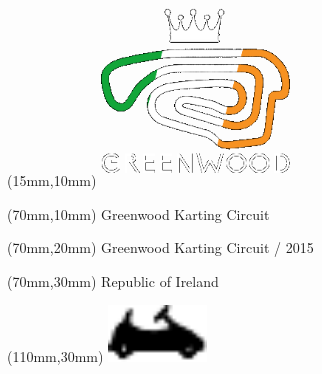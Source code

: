 \null\newpage
\begin{textblock*}{50mm}(15mm,10mm)%
\includegraphics[width=50mm]{LG/GRE.png}
\end{textblock*}
\begin{textblock*}{130mm}(70mm,10mm)%
{\fontsize{20}{20}\selectfont Greenwood Karting Circuit}\\
\end{textblock*}
\begin{textblock*}{120mm}(70mm,20mm)%
{\fontsize{16}{16}\selectfont Greenwood Karting Circuit / 2015}\\
\end{textblock*}
\begin{textblock*}{120mm}(70mm,30mm)%
{\fontsize{12}{12}\selectfont Republic of Ireland}
\end{textblock*}
\begin{textblock*}{30mm}(110mm,30mm)%
\centering
\includegraphics[height=15mm]{icons/kart.pdf}
\end{textblock*}
